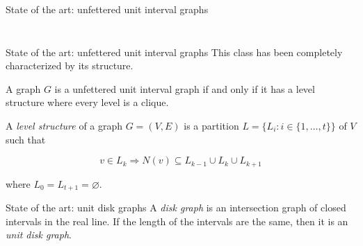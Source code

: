 \begin{frame}{State of the art: unfettered unit interval graphs}
\begin{columns}
\begin{column}{0.5\textwidth}
\begin{columns}
\begin{column}{0.5\textwidth}
\begin{figure}
\begin{tikzpicture}[scale=1.5]
\end{tikzpicture}
\label{fig:muigK13}
\end{figure}
\end{column}
\end{columns}

\end{column}
\end{columns}

\end{frame}

\begin{frame}{State of the art: unfettered unit interval graphs}
  This class has been completely characterized by its structure.

  \begin{theorem}[Hayashi]
      A graph $G$ is a unfettered unit interval graph if and only if it has a level structure where every level is a clique.
  \end{theorem}
  \vfill
  \begin{definition}
    A \emph{level structure} of a graph $G = (V,E)$ is a partition $L = \{L_i : i \in \{1,\dots, t\}\}$ of $V$ such that

    $$v \in L_k \Rightarrow N(v) \subseteq L_{k-1} \cup L_{k} \cup L_{k+1}$$

    where $L_0 = L_{t+1} = \varnothing$.
  \end{definition}
\end{frame}

\begin{frame}{State of the art: unit disk graphs}
  A \emph{disk graph} is an intersection graph of closed intervals in the real line. If the length of the intervals are the same, then it is an \emph{unit disk graph}.
  \vfill
  \begin{figure}
  \centering

  \label{fig:udg}
  \end{figure}
\end{frame}

